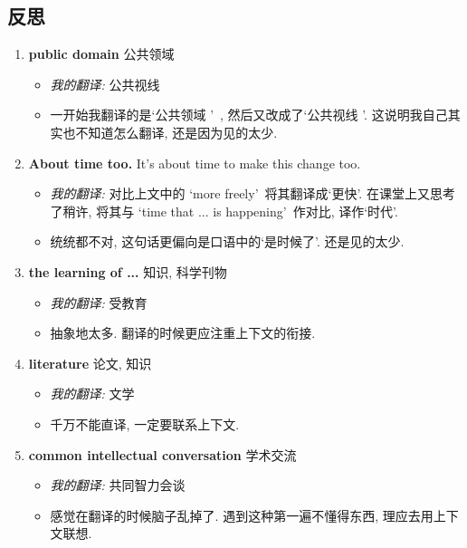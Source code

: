 \documentclass[a4paper, 12pt, UTF8]{article}
\begin{document}
\subsection{反思}
\begin{enumerate}[\hspace{0.5cm} 1.]
    \item {\bfseries public domain} 公共领域
          \begin{itemize}
              \item \emph{我的翻译:} 公共视线
              \item 一开始我翻译的是\lq 公共领域 \rq\ , 然后又改成了\lq 公共视线 \rq. 这说明我自己其实也不知道怎么翻译, 还是因为见的太少.
          \end{itemize}
    \item {\bfseries About time too.} It's about time to make this change too.
          \begin{itemize}
              \item \emph{我的翻译:} 对比上文中的 \lq more freely\rq\ 将其翻译成\lq 更快\rq. 在课堂上又思考了稍许, 将其与 \lq time that ... is happening\rq\ 作对比, 译作\lq 时代\rq. 
              \item 统统都不对, 这句话更偏向是口语中的\lq 是时候了\rq. 还是见的太少. 
          \end{itemize}
    \item {\bfseries the learning of ...} 知识, 科学刊物
          \begin{itemize}
              \item \emph{我的翻译:} 受教育
              \item 抽象地太多. 翻译的时候更应注重上下文的衔接.
          \end{itemize}
    \item {\bfseries literature} 论文, 知识
          \begin{itemize}
              \item \emph{我的翻译:} 文学
              \item 千万不能直译, 一定要联系上下文.
          \end{itemize}
    \item {\bfseries common intellectual conversation} 学术交流
          \begin{itemize}
              \item \emph{我的翻译:} 共同智力会谈 
              \item 感觉在翻译的时候脑子乱掉了. 遇到这种第一遍不懂得东西, 理应去用上下文联想.
          \end{itemize}

\end{enumerate}
\end{document}
